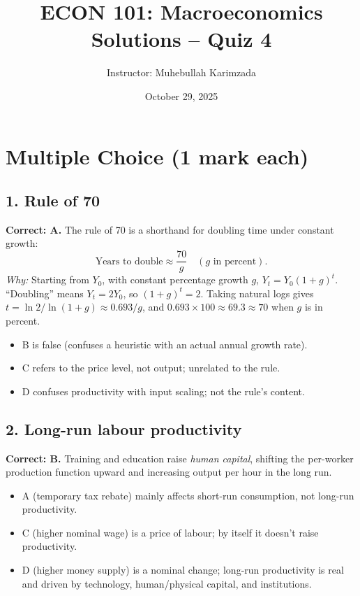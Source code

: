 \documentclass[12pt]{article}
\title{ECON 101: Macroeconomics \\ Solutions -- Quiz 4}
\author{Instructor: Muhebullah Karimzada}
\date{October 29,  2025}
\begin{document}
\maketitle

\section*{Multiple Choice (1 mark each)}

\subsection*{1. Rule of 70}
\textbf{Correct: A.} The rule of 70 is a shorthand for doubling time under constant growth: 
\[
\text{Years to double}\approx \frac{70}{g} \quad (\text{$g$ in percent}).
\]
\textit{Why:} Starting from $Y_0$, with constant percentage growth $g$, $Y_t=Y_0(1+g)^{t}$. ``Doubling'' means $Y_t=2Y_0$, so $(1+g)^t=2$. Taking natural logs gives $t=\ln 2/\ln(1+g)\approx 0.693/g$, and $0.693\times 100\approx 69.3\approx 70$ when $g$ is in percent.
\begin{itemize}
    \item B is false (confuses a heuristic with an actual annual growth rate).
    \item C refers to the price level, not output; unrelated to the rule.
    \item D confuses productivity with input scaling; not the rule's content.
\end{itemize}

\subsection*{2. Long-run labour productivity}
\textbf{Correct: B.} Training and education raise \emph{human capital}, shifting the per-worker production function upward and increasing output per hour in the long run.
\begin{itemize}
    \item A (temporary tax rebate) mainly affects short-run consumption, not long-run productivity.
    \item C (higher nominal wage) is a price of labour; by itself it doesn't raise productivity.
    \item D (higher money supply) is a nominal change; long-run productivity is real and driven by technology, human/physical capital, and institutions.
\end{itemize}
\newpage
\end{document}
